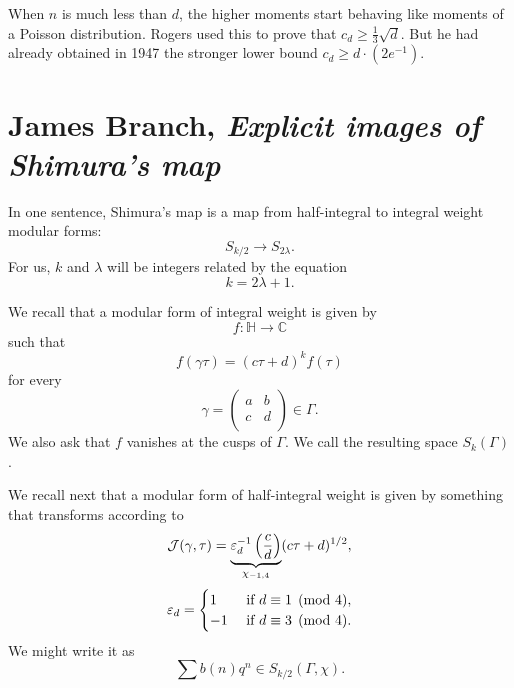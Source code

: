 \documentclass[reqno]{amsart} 
\begin{document}
When $n$ is much less than $d$, the higher moments start behaving like moments of a Poisson distribution.  Rogers used this to prove that $c_d \geq \tfrac{1}{3} \sqrt{d}$.  But he had already obtained in 1947 the stronger lower bound $c_d \geq d \cdot (2 e^{-1} )$.

\section{James Branch, \emph{Explicit images of Shimura's map}}
In one sentence, Shimura's map is a map from half-integral to integral weight modular forms:
\begin{equation*}
  S_{k / 2} \rightarrow S_{2 \lambda }.
\end{equation*}
For us, $k$ and $\lambda$ will be integers related by the equation
\begin{equation*}
  k = 2 \lambda + 1.
\end{equation*}

We recall that a modular form of integral weight is given by
\begin{equation*}
  f : \mathbb{H} \rightarrow \mathbb{C} 
\end{equation*}
such that
\begin{equation*}
  f (\gamma \tau )
  =
  (c \tau + d)^k f (\tau)
\end{equation*}
for every
\begin{equation*}
  \gamma =
  \begin{pmatrix}
    a & b \\
    c & d \\
  \end{pmatrix}
  \in \Gamma.
\end{equation*}
We also ask that $f$ vanishes at the cusps of $\Gamma$.  We call the resulting space $S_k (\Gamma) $.

We recall next that a modular form of half-integral weight is given by something that transforms according to
\begin{equation*}
  \mathcal{J} (\gamma, \tau )
  =
  \underbrace
  {
    \varepsilon_{d }^{-1} 
    \left( \frac{c}{d} \right)
  }_{
    \chi_{-1,4}
  }
  (c \tau + d )^{1/2},
\end{equation*}
\begin{equation*}
  \varepsilon_d =
  \begin{cases}
    1 & \text{ if } d \equiv 1 \pmod{4}, \\
    -1 & \text{ if } d \equiv 3 \pmod{4}.
  \end{cases}
\end{equation*}
We might write it as
\begin{equation*}
  \sum b(n) q^n  \in S_{k/2} (\Gamma, \chi).
\end{equation*}
\end{document}
